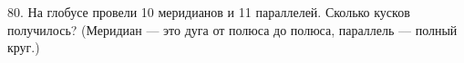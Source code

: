 80. На глобусе провели 10 меридианов и 11 параллелей. Сколько кусков получилось? (Меридиан --- это дуга от полюса до полюса, параллель --– полный круг.)\\
